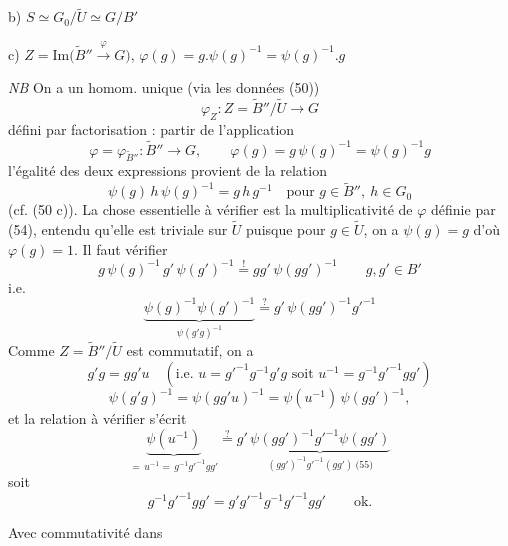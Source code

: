 \documentclass[11pt,a4paper]{article}
\begin{document}
b) $S\simeq G_0/\tilde{U}\simeq G/B'$

c) $Z=\mathrm{Im}\bigl(\tilde{B}''\xrightarrow{\ \varphi\ }G\bigr)$, \quad $\varphi(g)=g.\psi(g)^{-1}=\psi(g)^{-1}.g$


\emph{NB} On a un homom. unique (via les données (50))
\[
\varphi_Z : Z=\tilde{B}''/\tilde{U}\longrightarrow G \tag{53}
\]
 défini par factorisation : partir de l'application
\[
\varphi=\varphi_{\tilde{B}''} : \tilde{B}''\longrightarrow G,\qquad \varphi(g)=g\,\psi(g)^{-1}=\psi(g)^{-1}g \tag{54}
\]
l'égalité des deux expressions provient de la relation
\[
\psi(g)\,h\,\psi(g)^{-1}=g\,h\,g^{-1}\quad\text{pour } g\in\tilde{B}'',\ h\in G_0 \tag{55}
\]
(cf. (50 c)). La chose essentielle à vérifier est la multiplicativité de $\varphi$ définie par (54),  entendu qu'elle est triviale sur $\tilde{U}$ puisque pour $g\in\tilde{U}$, on a $\psi(g)=g$ d'où $\varphi(g)=1$.  Il faut vérifier
\[
g\,\psi(g)^{-1}\,g'\,\psi(g')^{-1}\overset{!}{=}gg'\,\psi(gg')^{-1}\qquad g,g'\in B'
\]
i.e.
\[
\underbrace{\psi(g)^{-1}\psi(g')^{-1}}_{\psi(g'g)^{-1}}\overset{?}{=}g'\,\psi(gg')^{-1}g'^{-1}
\]
Comme $Z=\tilde{B}''/\tilde{U}$ est commutatif, on a
\[
g'g=gg'u\quad (\text{i.e. } u=g'^{-1}g^{-1}g'g \text{ soit } u^{-1}=g^{-1}g'^{-1}gg')
\]
\[
\psi(g'g)^{-1}=\psi(gg'u)^{-1}=\psi(u^{-1})\,\psi(gg')^{-1},
\]
et la relation à vérifier s'écrit
\[
\underbrace{\psi(u^{-1})}_{=\,u^{-1}=\,g^{-1}g'^{-1}gg'}\overset{?}{=}g'\,\underbrace{\psi(gg')^{-1}g'^{-1}\psi(gg')}_{(gg')^{-1}g'^{-1}(gg')\ \text{(55)}}
\]
soit
\[
g^{-1}g'^{-1}gg'=g'g'^{-1}g^{-1}g'^{-1}gg' \qquad \text{ok.}
\]

Avec commutativité dans

\end{document}
